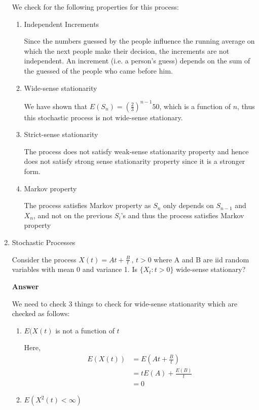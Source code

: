 \documentclass[12pt, oneside]{article}
\begin{document}
\begin{enumerate}
{    We check for the following properties for this process:
    \begin{enumerate}
        \item {
            Independent Increments

            Since the numbers guessed by the people influence the running average on which 
            the next people make their decision, the increments are not independent. An
            increment (i.e. a person's guess)  depends on the sum of the guessed of the people
            who came before him.
        }
        \item {
            Wide-sense stationarity

            We have shown that \(E(S_n) = \left(\frac{2}{3}\right)^{n-1} 50\), which is a function
            of \(n\), thus this stochastic process is not wide-sense stationary.
        }
        \item {
            Strict-sense stationarity 

            The process does not satisfy weak-sense stationarity property and hence does not
            satisfy strong sense stationarity property since it is a stronger form.
        }
        \item {
            Markov property

            The process satisfies Markov property as \(S_n\) only depends on \(S_{n-1}\)
            and \(X_{n}\), and not on the previous \(S_i\)'s and thus the process
            satisfies Markov property
        }
    \end{enumerate}
}

\item {
    Stochastic Processes

    Consider the process \(X(t) = At + \frac{B}{t} \,,\, t > 0\) where A and B are iid random variables
    with mean 0 and variance 1. Is \(\{X_t : t > 0\}\) wide-sense stationary?

    \textbf{Answer}

    We need to check 3 things to check for wide-sense stationarity which are checked
    as follows:
    \begin{enumerate}
        \item {
            \(E(X(t)\) is not a function of \(t\)

            Here, 
            \begin{align*}
                E(X(t)) &= E\left(At + \frac{B}{t}\right) \\
                        &= t E(A) + \frac{E(B)}{t} \tag*{(Using linearity of expectation)} \\
                        &= 0 \tag*{(Since E(A) = E(B) = 0 is given)}
            \end{align*}
        }
        \item {
            \(E(X^2(t) < \infty)\)

}
\end{enumerate}}
\end{enumerate}
\end{document}

